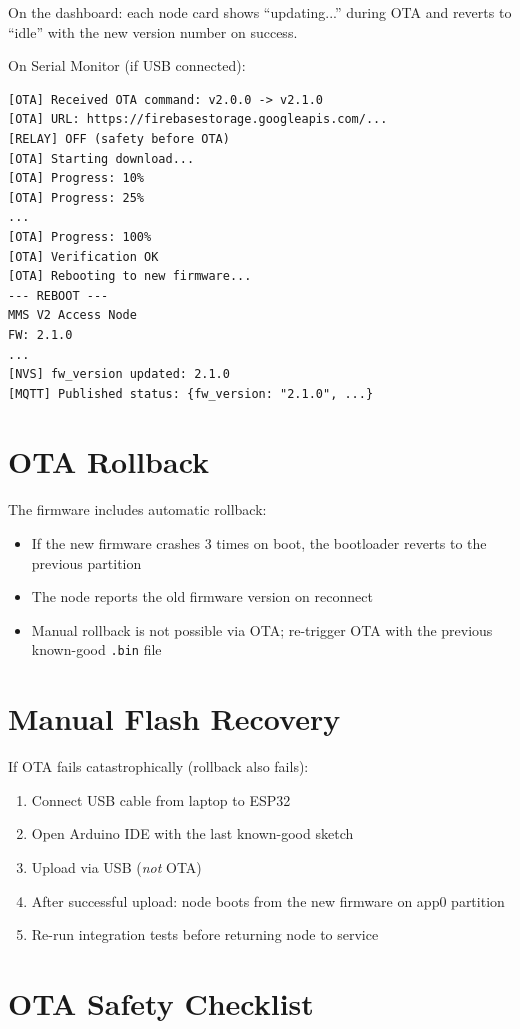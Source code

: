 On the dashboard: each node card shows ``updating...'' during OTA and reverts to ``idle'' with the new version number on success.

On Serial Monitor (if USB connected):
\begin{verbatim}
[OTA] Received OTA command: v2.0.0 -> v2.1.0
[OTA] URL: https://firebasestorage.googleapis.com/...
[RELAY] OFF (safety before OTA)
[OTA] Starting download...
[OTA] Progress: 10%
[OTA] Progress: 25%
...
[OTA] Progress: 100%
[OTA] Verification OK
[OTA] Rebooting to new firmware...
--- REBOOT ---
MMS V2 Access Node
FW: 2.1.0
...
[NVS] fw_version updated: 2.1.0
[MQTT] Published status: {fw_version: "2.1.0", ...}
\end{verbatim}

\section{OTA Rollback}

The firmware includes automatic rollback:
\begin{itemize}[leftmargin=1.5em]
    \item If the new firmware crashes 3 times on boot, the bootloader reverts to the previous partition
    \item The node reports the old firmware version on reconnect
    \item Manual rollback is not possible via OTA; re-trigger OTA with the previous known-good \texttt{.bin} file
\end{itemize}

\section{Manual Flash Recovery}

If OTA fails catastrophically (rollback also fails):
\begin{enumerate}[leftmargin=1.5em]
    \item Connect USB cable from laptop to ESP32
    \item Open Arduino IDE with the last known-good sketch
    \item Upload via USB (\textit{not} OTA)
    \item After successful upload: node boots from the new firmware on app0 partition
    \item Re-run integration tests before returning node to service
\end{enumerate}

\section{OTA Safety Checklist}

